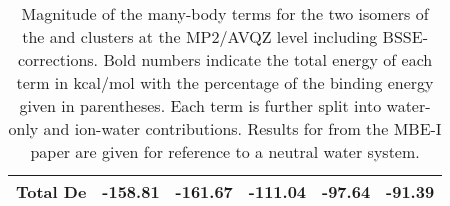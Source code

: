 \begin{table}[t]
\begin{adjustbox}{width=\columnwidth,center}
\begin{tabular}{@{}llllll@{}}
Total De          & -158.81         & -161.67         & -111.04         & -97.64          & -91.39       \\ \bottomrule
\end{tabular}
\end{adjustbox}
\begin{spacing}{1.0}
\caption[Magnitude of the many-body terms for the two isomers of the  and  clusters at the MP2/AVQZ level including BSSE-corrections. Bold numbers indicate the total energy of each term in kcal/mol with the percentage of the binding energy given in parentheses. Each term is further split into water-only and ion-water contributions. Results for  from the MBE-I paper are given for reference to a neutral water system.]{Magnitude of the many-body terms for the two isomers of the  and  clusters at the MP2/AVQZ level including BSSE-corrections. Bold numbers indicate the total energy of each term in kcal/mol with the percentage of the binding energy given in parentheses. Each term is further split into water-only and ion-water contributions. Results for  from the MBE-I paper are given for reference to a neutral water system.}\label{tab:MBE_II_1}
\end{spacing}
\end{table}
